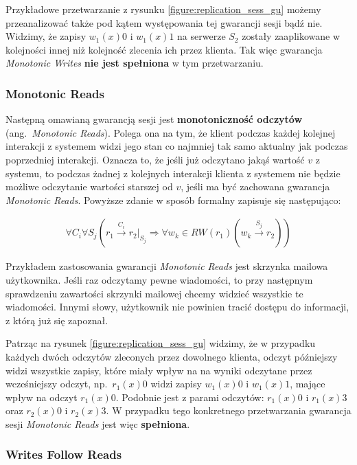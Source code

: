 Przykładowe przetwarzanie z rysunku \ref{figure:replication_sess_gu} możemy przeanalizować także pod kątem występowania tej gwarancji sesji bądź nie. Widzimy, że zapisy $ w_1(x)0 $ i $ w_1(x)1 $ na serwerze $ S_2 $ zostały zaaplikowane w kolejności innej niż kolejność zlecenia ich przez klienta. Tak więc gwarancja \textit{Monotonic Writes} \textbf{nie jest spełniona} w tym przetwarzaniu.

\subsubsection{Monotonic Reads}

Następną omawianą gwarancją sesji jest \textbf{monotoniczność odczytów} (ang.\ \textit{Monotonic Reads}). Polega ona na tym, że klient podczas każdej kolejnej interakcji z systemem widzi jego stan co najmniej tak samo aktualny jak podczas poprzedniej interakcji. Oznacza to, że jeśli już odczytano jakąś wartość $ v $ z systemu, to podczas żadnej z kolejnych interakcji klienta z systemem nie będzie możliwe odczytanie wartości starszej od $ v $, jeśli ma być zachowana gwarancja \textit{Monotonic Reads}. Powyższe zdanie w sposób formalny zapisuje się następująco:

\begin{align*}
    \forall{C_i} \forall{S_j} (r_1 \xrightarrow{C_i} r_2|_{S_j} \Rightarrow \forall{w_k} \in RW(r_1) (w_k \xrightarrow{S_j} r_2))
\end{align*}

Przykładem zastosowania gwarancji \textit{Monotonic Reads} jest skrzynka mailowa użytkownika. Jeśli raz odczytamy pewne wiadomości, to przy następnym sprawdzeniu zawartości skrzynki mailowej chcemy widzieć wszystkie te wiadomości. Innymi słowy, użytkownik nie powinien tracić dostępu do informacji, z którą już się zapoznał.

Patrząc na rysunek \ref{figure:replication_sess_gu} widzimy, że w przypadku każdych dwóch odczytów
zleconych przez dowolnego klienta, odczyt późniejszy widzi wszystkie zapisy, które miały wpływ na na
wyniki odczytane przez wcześniejszy odczyt, np.\ $ r_1(x)0 $ widzi zapisy $ w_1(x)0 $ i $ w_1(x)1 $, mające wpływ na odczyt $ r_1(x)0 $. Podobnie jest z parami odczytów: $ r_1(x)0 $ i $ r_1(x)3 $ oraz $ r_2(x)0 $ i $ r_2(x)3 $. W przypadku tego konkretnego przetwarzania gwarancja sesji \textit{Monotonic Reads} jest więc \textbf{spełniona}.

\subsubsection{Writes Follow Reads}

